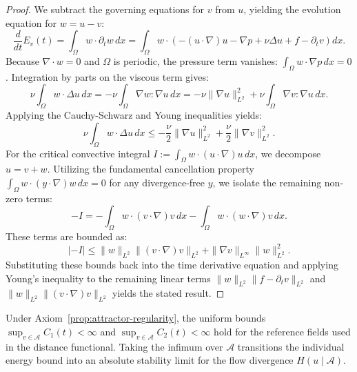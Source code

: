 \documentclass[12pt,a4paper]{article}
\theoremstyle{definition}
\theoremstyle{plain}
\theoremstyle{remark}
\begin{document}
\begin{proof}
We subtract the governing equations for $v$ from $u$, yielding the evolution equation for $w = u - v$:
\begin{equation}
    \frac{d}{dt} E_{v}(t) = \int_\Omega w \cdot \partial_t w \, dx = \int_\Omega w \cdot \left( -(u \cdot \nabla)u - \nabla p + \nu \Delta u + f - \partial_t v \right) dx.
\end{equation}
Because $\nabla \cdot w = 0$ and $\Omega$ is periodic, the pressure term vanishes: $\int_\Omega w \cdot \nabla p \, dx = 0$.
Integration by parts on the viscous term gives:
\begin{equation}
    \nu \int_\Omega w \cdot \Delta u \, dx = - \nu \int_\Omega \nabla w : \nabla u \, dx = - \nu \|\nabla u\|_{L^2}^2 + \nu \int_\Omega \nabla v : \nabla u \, dx.
\end{equation}
Applying the Cauchy-Schwarz and Young inequalities yields:
\begin{equation}
    \nu \int_\Omega w \cdot \Delta u \, dx \le - \frac{\nu}{2} \|\nabla u\|_{L^2}^2 + \frac{\nu}{2} \|\nabla v\|_{L^2}^2.
\end{equation}
For the critical convective integral $I := \int_\Omega w \cdot (u \cdot \nabla)u \, dx$, we decompose $u = v + w$. Utilizing the fundamental cancellation property $\int_\Omega w \cdot (y \cdot \nabla)w \, dx = 0$ for any divergence-free $y$, we isolate the remaining non-zero terms:
\begin{equation}
    - I = - \int_\Omega w \cdot (v \cdot \nabla)v \, dx - \int_\Omega w \cdot (w \cdot \nabla)v \, dx.
\end{equation}
These terms are bounded as:
\begin{equation}
    |-I| \le \|w\|_{L^2} \|(v \cdot \nabla)v\|_{L^2} + \|\nabla v\|_{L^\infty} \|w\|_{L^2}^2.
\end{equation}
Substituting these bounds back into the time derivative equation and applying Young's inequality to the remaining linear terms $\|w\|_{L^2} \|f - \partial_t v\|_{L^2}$ and $\|w\|_{L^2} \|(v \cdot \nabla)v\|_{L^2}$ yields the stated result.
\end{proof}

Under Axiom~\ref{prop:attractor-regularity}, the uniform bounds $\sup_{v \in \mathcal{A}} C_1(t) < \infty$ and $\sup_{v \in \mathcal{A}} C_2(t) < \infty$ hold for the reference fields used in the distance functional. Taking the infimum over $\mathcal{A}$ transitions the individual energy bound into an absolute stability limit for the flow divergence $H(u \mid \mathcal{A})$.
\end{document}
